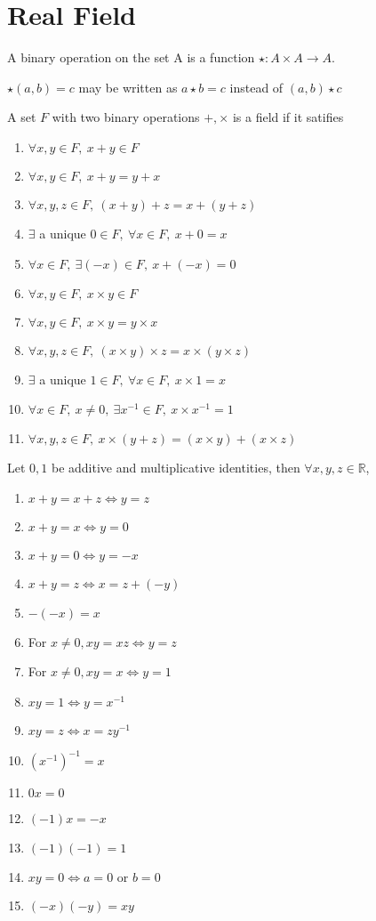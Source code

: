 \section{Real Field}
	\begin{definition}
		A binary operation on the set A is a function $\star : A \times A \to A$.
	\end{definition}
	\begin{remark}
		$\star(a,b)=c$ may be written as $a\star b = c$ instead of $(a,b)\star c$
	\end{remark}
	\begin{axiom}[Field]
		A set $F$ with two binary operations $+,\times$ is a field if it satifies
		\begin{enumerate}
		 	\item $\forall x,y \in F,\ x+y \in F$
		 	\item $\forall x,y \in F,\ x+y = y+x$
		 	\item $\forall x,y,z \in F,\ (x+y)+z = x+(y+z)$
		 	\item $\exists$ a unique $0 \in F,\ \forall x \in F,\ x+0 = x$
		 	\item $\forall x \in F,\ \exists (-x) \in F,\ x+(-x) = 0$
		 	\item $\forall x,y \in F,\ x\times y \in F$
		 	\item $\forall x,y \in F,\ x \times y = y \times x $
		 	\item $\forall x,y,z \in F,\ (x \times y)\times z = x \times (y \times z)$
		 	\item $\exists$ a unique $1 \in F,\ \forall x \in F,\ x \times 1 = x$
		 	\item $\forall x \in F,\ x \neq 0,\ \exists x^{-1} \in F,\ x \times x^{-1} = 1$
		 	\item $\forall x,y,z \in F,\ x\times(y+z) = (x \times y) + (x \times z)$
		\end{enumerate}
	\end{axiom}
	\begin{remark}
		Let $0,1$ be additive and multiplicative identities, then $\forall x,y,z \in \mathbb{R}$,
		\begin{enumerate}
			\item $x+y = x+z \iff y = z$
			\item $x+y = x \iff y = 0$
			\item $x+y = 0 \iff y = -x$
			\item $x + y = z \iff x = z + (-y)$
			\item $-(-x) = x$
			\item For $x \ne 0, xy = xz \iff y = z$
			\item For $x \ne 0, xy = x \iff y = 1$
			\item $xy = 1 \iff y = x^{-1}$
			\item $xy = z \iff x = zy^{-1}$
			\item $(x^{-1})^{-1} = x$
			\item $0x = 0$
			\item $(-1)x = -x$
			\item $(-1)(-1) = 1$
			\item $xy = 0 \iff a = 0 \text{ or } b = 0$
			\item $(-x)(-y) = xy$
		\end{enumerate}
	\end{remark}

